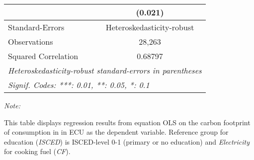\begin{table}[htbp!]
\begin{adjustbox}{width = 1\textwidth, max height = 0.95\textheight, center}
\begin{threeparttable}[b]
\begin{tabular}{lc}
                                & (0.021)\\   
            \midrule 
            Standard-Errors     & Heteroskedasticity-robust \\   
            Observations        & 28,263\\  
            Squared Correlation & 0.68797\\  
            \midrule \midrule
            \multicolumn{2}{l}{\emph{Heteroskedasticity-robust standard-errors in parentheses}}\\
            \multicolumn{2}{l}{\emph{Signif. Codes: ***: 0.01, **: 0.05, *: 0.1}}\\
         \end{tabular}
         
         \begin{tablenotes}\item \medskip \textit{Note:}
            \item This table displays regression results from equation OLS on the carbon footprint of consumption in  in ECU as the dependent variable.  Reference group for education (\textit{ISCED}) is ISCED-level 0-1 (primary or no education) and \textit{Electricity} for cooking fuel (\textit{CF}).
         \end{tablenotes}
      \end{threeparttable}
   \end{adjustbox}
\end{table}


